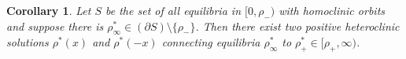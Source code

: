 \documentclass[10pt]{article}
\newtheorem{Theorem}{Theorem}
\newtheorem{Corollary}[Lemma]{Corollary}
\newenvironment{Proof}%
 {\begin{trivlist} \item[]{\bf Proof. }}%
 {\hspace*{\fill}$\rule{.4\baselineskip}{.4\baselineskip}$\end{trivlist}}
\renewcommand{\leq}{\leqslant}
\renewcommand{\geq}{\geqslant}
\begin{document}
\begin{Corollary} Let $S$ be the set of all equilibria in $[0,\rho_-)$ with homoclinic orbits and suppose there is $\rho_\infty^* \in (\partial S)\setminus \{\rho_-\}$. Then there exist two positive heteroclinic solutions $\rho^*(x)$ and $\rho^*(-x)$ connecting equilibria $\rho^*_\infty$ to $\rho_+^* \in [\rho_+,\infty)$.  
\end{Corollary}




% 
% 
% 
% 
% 
% 
\end{document}
